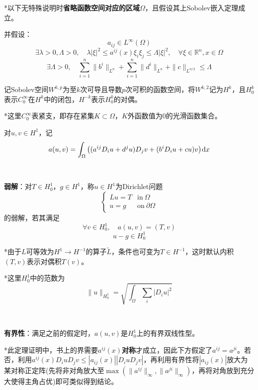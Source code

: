 \documentclass[a4paper,UTF8,fontset=windows,AutoFakeBold]{ctexart}
\newcommand*{\dr}{\hspace{0.07em}\mathrm{d}}
\begin{document}
*以下无特殊说明时\textbf{省略函数空间对应的区域}$\Omega$，且假设其上Sobolev嵌入定理成立。

并假设：
$$a_{ij}\in L^\infty(\Omega)$$
$$\exists\lambda>0,\Lambda>0,\quad\lambda|\xi|^2\le a^{ij}(x)\xi_i\xi_j\le\Lambda|\xi|^2,\quad\forall\xi\in\mathbb{R}^n,x\in\Omega$$
$$\exists\Lambda>0,\quad\sum_{i=1}^n\|b^i\|_{L^n}+\sum_{i=1}^n\|d^i\|_{L^n}+\|c\|_{L^{n/2}}\le\Lambda$$

记Sobolev空间$W^{k,p}$为至$k$次可导且导数$p$次可积的函数空间，将$W^{k,2}$记为$H^k$，且$H_0^k$表示$C_0^\infty$在$H^k$中的闭包，$H^{-k}$表示$H_0^k$的对偶。

*这里$C_0^\infty$表紧支，即存在紧集$K\subset\Omega$，$K$外函数值为0的光滑函数集合。

对$u,v\in H^1$，记
$$a(u,v)=\int_\Omega\big((a^{ij}D_iu+d^ju)D_jv+(b^iD_iu+cu)v\big)\dr x$$

\

\textbf{弱解}：对$T\in H_0^1$，$g\in H^1$，称$u\in H^1$为Dirichlet问题
$$\begin{cases}Lu=T&\text{in}\ \Omega\\u=g&\text{on}\ \partial\Omega\end{cases}$$
的弱解，若其满足
$$\forall v\in H_0^1,\quad a(u,v)=(T,v)$$
$$u-g\in H_0^1$$

*由于$L$可等效为$H^1\to H^{-1}$的算子$\tilde{L}$，条件也可变为$T\in H^{-1}$，这时默认内积$(T,v)$表示对偶积$T(v)$。

*这里$H_0^1$中的范数为
$$\|u\|_{H_0^1}=\sqrt{\int_\Omega\sum_i|D_iu|^2}$$

\

\textbf{有界性}：满足之前的假定时，$a(u,v)$是$H_0^1$上的有界双线性型。

*此定理证明中，书上的界需要$a^{ij}(x)$\textbf{对称}才成立，因此下方假定了$a^{ij}=a^{ji}$。若否，利用$a^{ij}(x)D_iuD_jv\le|a_{ij}(x)||D_iuD_jv|$，再利用有界性将$|a_{ij}(x)|$放大为某对称正定阵(先将非对角放大至$\max(\|a^{ij}\|_\infty,\|a^{ji}\|_\infty)$，再将对角放到充分大使得主角占优)即可类似得到结论。
\end{document}
